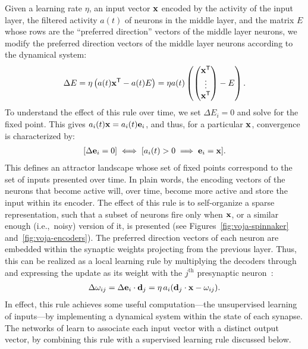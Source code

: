 Given a learning rate $\eta$, an input vector $\mathbf{x}$ encoded by the activity of the input layer, the filtered activity $a(t)$ of  neurons in the middle layer, and the matrix $E$ whose rows are the ``preferred direction'' vectors of the middle layer neurons, we modify the preferred direction vectors of the middle layer neurons according to the dynamical system:
\begin{align} \label{voja}
    \Delta{E} = \eta \left( a(t) {\mathbf{x}}^\mathsf{T} - a(t)E \right) = \eta a(t) \left( \begin{pmatrix} {\mathbf{x}}^\mathsf{T} \\ \vdots \\ {\mathbf{x}}^\mathsf{T} \end{pmatrix} - E \right) \text{.}
\end{align}
To understand the effect of this rule over time, we set $\Delta{E_i} = 0$ and solve for the fixed point.
This gives $a_i(t) \mathbf{x} = a_i(t) \mathbf{e}_i$, and thus, for a particular $\mathbf{x}$, convergence is characterized by:
\begin{align} \label{stability}
    [\Delta{\mathbf{e}_i} = 0]  \iff  [a_i(t) > 0  \implies  \mathbf{e}_i = \mathbf{x}] \text{.}
\end{align}
This defines an attractor landscape whose set of fixed points correspond to the set of inputs presented over time.
In plain words, the encoding vectors of the neurons that become active will, over time, become more active and store the input within its encoder.
The effect of this rule is to self-organize a sparse representation, such that a subset of neurons fire only when $\mathbf{x}$, or a similar enough (i.e.,~noisy) version of it, is presented (see Figures~\ref{fig:voja-spinnaker} and~\ref{fig:voja-encoders}).
The preferred direction vectors of each neuron are embedded within the synaptic weights projecting from the previous layer.
Thus, this can be realized as a local learning rule by multiplying the decoders through and expressing the update as its weight with the $j^\text{th}$ presynaptic neuron~\citep{knight2016}:
\begin{align}
  \label{eq:voja-weights}
  \Delta \omega_{ij} = \Delta \mathbf{e}_i \cdot \mathbf{d}_j = \eta \, a_i (\mathbf{d}_j \cdot \mathbf{x} - \omega_{ij}) \text{.}
\end{align}
In effect, this rule achieves some useful computation---the unsupervised learning of inputs---by implementing a dynamical system within the state of each synapse.
The networks of \citet{knight2016, aubin2016a} learn to associate each input vector with a distinct output vector, by combining this rule with a supervised learning rule discussed below.

